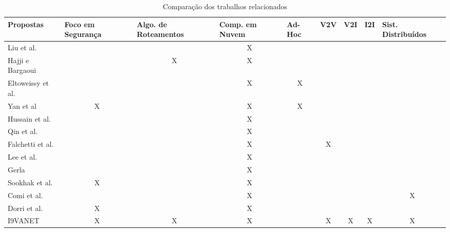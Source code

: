 \documentclass[
	12pt,				%
	oneside,			%
	a4paper,			%
	english,			%
	brazil				%
	]{abntex2ppgsi}
\begin{document}
\begin{table}[h!]
	\centering
	\caption{Comparação dos trabalhos relacionados} 
	\label{tab:trabalhosrelacionados}
	\begin{tabular}{|p{3.0cm}| p{}| p{2cm}| p{}| p{}| p{} | p{} | p{} | p{} |}
		\hline
		\rowcolor[gray]{0.7}
		Propostas &  Foco em Segurança &  Algo. de Roteamentos & Comp. em Nuvem & Ad-Hoc & \multicolumn{1}{c|}{V2V}   &  \multicolumn{1}{c|}{V2I}  & \multicolumn{1}{c|}{I2I}   & Sist. Distribuídos \\ \hline
		Liu et al.\citeonline{liu2015software}	 &  &  & \multicolumn{1}{c|}{X}  & & & & &  \\ \hline
		Hajji e Bargaoui \cite{hajjidesign}  &  & \multicolumn{1}{c|}{X}   & \multicolumn{1}{c|}{X}   & &  & & & \\ \hline	
		Eltoweissy et al. \citeonline{eltoweissy2010towards}	 &  &  &  \multicolumn{1}{c|}{X} &  \multicolumn{1}{c|}{X} & & & & \\ \hline	
		Yan et al \citeonline{yan2013security} 	 &  \multicolumn{1}{c|}{X} &  &  \multicolumn{1}{c|}{X} &  \multicolumn{1}{c|}{X} & & & & \\ \hline	
		Hussain et al. \citeonline{hussain2012rethinking}	 &  &  &  \multicolumn{1}{c|}{X}  & & &  & &\\ \hline	
		Qin et al. \citeonline{qin2012vehicloud}	 &  &  &  \multicolumn{1}{c|}{X}  & & & & & \\ \hline		
		Falchetti et al. \citeonline{falchetti2015vehicular}	 &  &  &  \multicolumn{1}{c|}{X}   & & \multicolumn{1}{c|}{X}  & & & \\ \hline		
		Lee et al. \citeonline{lee2014vehicular}	  &  &  & \multicolumn{1}{c|}{X}   & & & & & \\ \hline				
		Gerla \citeonline{gerla2012vehicular}	  &  &  & \multicolumn{1}{c|}{X}  & &  & & &\\ \hline		
		Sookhak et al. \citeonline{sookhak2017secure}	  &  \multicolumn{1}{c|}{X}  &  & \multicolumn{1}{c|}{X}  & &  & & &\\ \hline		
		Comi et al. \citeonline{comi2015evolutionary}	  &   &  & \multicolumn{1}{c|}{X}  & &  & & &  \multicolumn{1}{c|}{X}\\ \hline		
		Dorri et al. \citeonline{dorri2017blockchain}	 & \multicolumn{1}{c|}{X} &  & \multicolumn{1}{c|}{X}  & & &  & & \\ \hline
		I9VANET	  & \multicolumn{1}{c|}{X}  & \multicolumn{1}{c|}{X} &  \multicolumn{1}{c|}{X} &  & \multicolumn{1}{c|}{X} & \multicolumn{1}{c|}{X} & \multicolumn{1}{c|}{X} & \multicolumn{1}{c|}{X} \\ \hline	
	\end{tabular}
	
\end{table}
%
\end{document}
